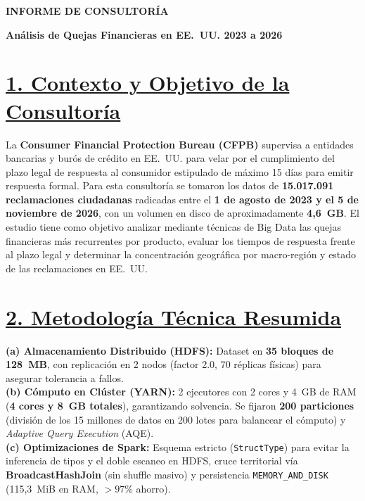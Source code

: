 \documentclass[12pt,letterpaper]{article}
\begin{document}
{\centering
    {\fontsize{13}{15}\selectfont \textbf{INFORME DE CONSULTORÍA}}\par
    \vspace{0.15em}
    {\fontsize{11}{13}\selectfont \textbf{Análisis de Quejas Financieras en EE.~UU. 2023 a 2026}}\par
}
\vspace{0.2em}

\section*{\underline{1. Contexto y Objetivo de la Consultoría}}
La \textbf{Consumer Financial Protection Bureau (CFPB)} supervisa a entidades bancarias y burós de crédito en EE.~UU. para velar por el cumplimiento del plazo legal de respuesta al consumidor estipulado de máximo 15 días para emitir respuesta formal. Para esta consultoría se tomaron los datos de \textbf{15.017.091 reclamaciones ciudadanas} radicadas entre el \textbf{1 de agosto de 2023 y el 5 de noviembre de 2026}, con un volumen en disco de aproximadamente \textbf{4,6~GB}. El estudio tiene como objetivo analizar mediante técnicas de Big Data las quejas financieras más recurrentes por producto, evaluar los tiempos de respuesta frente al plazo legal y determinar la concentración geográfica por macro-región y estado de las reclamaciones en EE.~UU.

\section*{\underline{2. Metodología Técnica Resumida}}
\textbf{(a) Almacenamiento Distribuido (HDFS):} Dataset en \textbf{35 bloques de 128~MB}, con replicación en 2 nodos (factor 2.0, 70 réplicas físicas) para asegurar tolerancia a fallos. \\
\textbf{(b) Cómputo en Clúster (YARN):} 2 ejecutores con 2 cores y 4~GB de RAM (\textbf{4 cores y 8~GB totales}), garantizando solvencia. Se fijaron \textbf{200 particiones} (división de los 15 millones de datos en 200 lotes para balancear el cómputo) y \textit{Adaptive Query Execution} (AQE). \\
\textbf{(c) Optimizaciones de Spark:} Esquema estricto (\texttt{StructType}) para evitar la inferencia de tipos y el doble escaneo en HDFS, cruce territorial vía \textbf{BroadcastHashJoin} (sin shuffle masivo) y persistencia \texttt{MEMORY\_AND\_DISK} (115,3~MiB en RAM, $>97\%$ ahorro).
\end{document}
